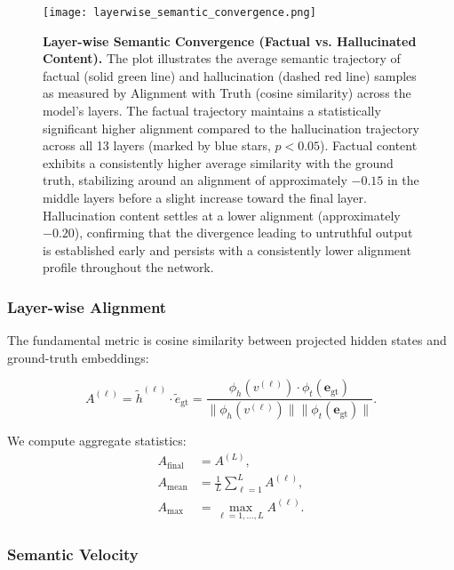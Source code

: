 \documentclass[11pt]{article}
\begin{document}
\begin{figure}[h]
\centering
\texttt{[image: layerwise\_semantic\_convergence.png]}
\caption{\textbf{Layer-wise Semantic Convergence (Factual vs. Hallucinated Content).}
The plot illustrates the average semantic trajectory of factual (solid green line) and hallucination (dashed red line) samples as measured by Alignment with Truth (cosine similarity) across the model's layers.
The factual trajectory maintains a statistically significant higher alignment compared to the hallucination trajectory across all 13 layers (marked by blue stars, $p < 0.05$).
Factual content exhibits a consistently higher average similarity with the ground truth, stabilizing around an alignment of approximately $-0.15$ in the middle layers before a slight increase toward the final layer.
Hallucination content settles at a lower alignment (approximately $-0.20$), confirming that the divergence leading to untruthful output is established early and persists with a consistently lower alignment profile throughout the network.}

\label{fig:layerwise_semantic_convergence}
\end{figure}

\subsubsection{Layer-wise Alignment}

The fundamental metric is cosine similarity between projected hidden states and ground-truth embeddings:

\begin{equation}
A^{(\ell)} = \tilde{h}^{(\ell)} \cdot \tilde{e}_{\text{gt}} = \frac{\phi_h(v^{(\ell)}) \cdot \phi_t(\mathbf{e}_{\text{gt}})}{\|\phi_h(v^{(\ell)})\| \|\phi_t(\mathbf{e}_{\text{gt}})\|}.
\label{eq:alignment}
\end{equation}

We compute aggregate statistics:
\begin{align}
A_{\text{final}} &= A^{(L)}, \\
A_{\text{mean}} &= \frac{1}{L} \sum_{\ell=1}^{L} A^{(\ell)}, \\
A_{\text{max}} &= \max_{\ell=1,\ldots,L} A^{(\ell)}.
\end{align}

\subsubsection{Semantic Velocity}
\end{document}
